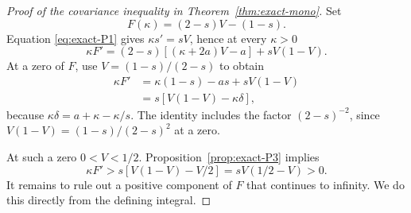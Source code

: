 \begin{proof}[Proof of the covariance inequality in Theorem~\ref{thm:exact-mono}] Set
\begin{equation}
 F(\kappa)=(2-s)V-(1-s).
\end{equation}
Equation \eqref{eq:exact-P1} gives \(\kappa s'=sV\), hence at every \(\kappa>0\)
\begin{equation}
 \kappa F'=(2-s)[(\kappa+2a)V-a]+sV(1-V).             \label{eq:exact-P10}
\end{equation}
At a zero of \(F\), use \(V=(1-s)/(2-s)\) to obtain
\begin{equation}
\begin{aligned}
 \kappa F'
 &=\kappa(1-s)-as+sV(1-V)\\
 &=s[V(1-V)-\kappa\delta],                           \label{eq:exact-P11}
\end{aligned}
\end{equation}
because \(\kappa\delta=a+\kappa-\kappa/s\). The identity includes the factor \((2-s)^{-2}\), since \(V(1-V)=(1-s)/(2-s)^2\) at a zero.

At such a zero \(0<V<1/2\). Proposition~\ref{prop:exact-P3} implies
\begin{equation}
 \kappa F'>s[V(1-V)-V/2]=sV(1/2-V)>0.                \label{eq:exact-P12}
\end{equation}
It remains to rule out a positive component of \(F\) that continues to infinity. We do this directly from the defining integral.


\end{proof}
